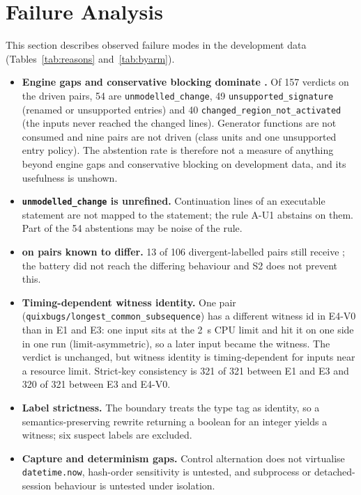 \section{Failure Analysis}\label{sec:failure}
This section describes observed failure modes in the development data (Tables~\ref{tab:reasons} and~\ref{tab:byarm}).
\begin{itemize}
\item \textbf{Engine gaps and conservative blocking dominate \INS{}.} Of 157 \INS{} verdicts on the driven pairs, 54 are \texttt{unmodelled\_change}, 49 \texttt{unsupported\_signature} (renamed or unsupported entries) and 40 \texttt{changed\_region\_not\_activated} (the inputs never reached the changed lines). Generator functions are not consumed and nine pairs are not driven (class units and one unsupported entry policy). The abstention rate is therefore not a measure of anything beyond engine gaps and conservative blocking on development data, and its usefulness is unshown.
\item \textbf{\texttt{unmodelled\_change} is unrefined.} Continuation lines of an executable statement are not mapped to the statement; the rule A-U1 abstains on them. Part of the 54 abstentions may be noise of the rule.
\item \textbf{\NDO{} on pairs known to differ.} 13 of 106 divergent-labelled pairs still receive \NDO{}; the battery did not reach the differing behaviour and S2 does not prevent this.
\item \textbf{Timing-dependent witness identity.} One pair (\texttt{quixbugs/longest\_common\_subsequence}) has a different witness id in E4-V0 than in E1 and E3: one input sits at the 2~s CPU limit and hit it on one side in one run (limit-asymmetric), so a later input became the witness. The verdict is unchanged, but witness identity is timing-dependent for inputs near a resource limit. Strict-key consistency is 321 of 321 between E1 and E3 and 320 of 321 between E3 and E4-V0.
\item \textbf{Label strictness.} The boundary treats the type tag as identity, so a semantics-preserving rewrite returning a boolean for an integer yields a witness; six suspect labels are excluded.
\item \textbf{Capture and determinism gaps.} Control alternation does not virtualise \texttt{datetime.now}, hash-order sensitivity is untested, and subprocess or detached-session behaviour is untested under isolation.
\end{itemize}
